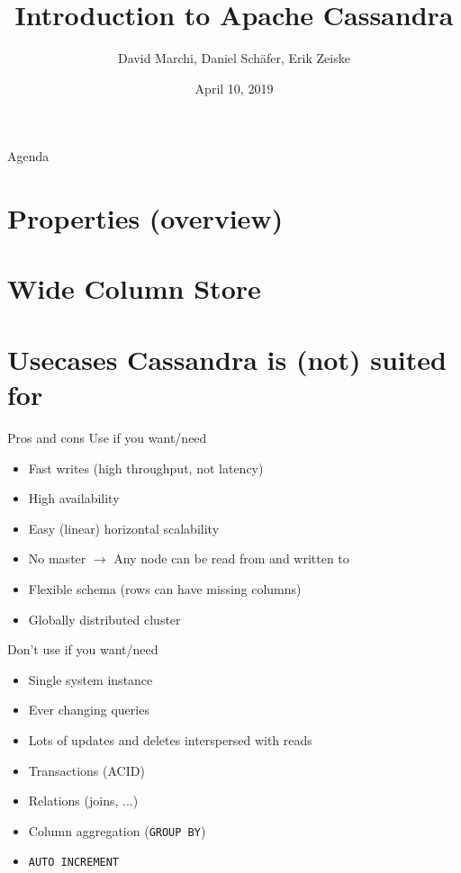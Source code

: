\documentclass[10pt]{beamer}
\title{Introduction to Apache Cassandra}
\subtitle{}
\date{April 10, 2019}
\author{David Marchi, Daniel Schäfer, Erik Zeiske}
\begin{document}
\maketitle

\begin{frame}{Agenda}
  \tableofcontents
\end{frame}

\section{Properties (overview)}  %

\section{Wide Column Store}  %

\section{Usecases Cassandra is (not) suited for}  %
\begin{frame}{Pros and cons}
  Use if you want/need
  \begin{itemize}
    \item Fast writes (high throughput, not latency)
    \item High availability
    \item Easy (linear) horizontal scalability
    \item No master $\rightarrow$ Any node can be read from and written to
    \item Flexible schema (rows can have missing columns)
    \item Globally distributed cluster
  \end{itemize}

  Don't use if you want/need
  \begin{itemize}
    \item Single system instance
    \item Ever changing queries
    \item Lots of updates and deletes interspersed with reads
    \item Transactions (ACID)
    \item Relations (joins, ...)
    \item Column aggregation (\lstinline{GROUP BY})
    \item \lstinline{AUTO INCREMENT}
  \end{itemize}
\end{frame}
\end{document}
